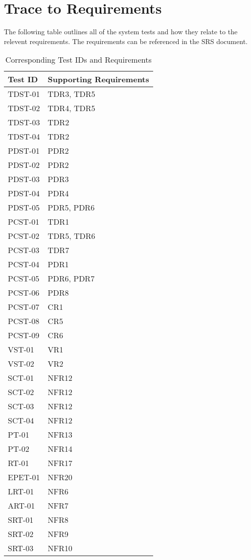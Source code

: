 \documentclass[12pt, titlepage]{article}
\begin{document}
\section{Trace to Requirements}

The following table outlines all of the system tests and how they relate to the
relevent requirements. The requirements can be referenced in the SRS document.\\

\begin{longtable}{ |p{4cm}|p{8cm}|  }
  \caption{Corresponding Test IDs and Requirements}
  \label{tab:Table1}\\
  
  \hline
  \textbf{Test ID} & \textbf{Supporting Requirements}\\
  \hline
  TDST-01 &  TDR3, TDR5\\
  \hline
  TDST-02 &  TDR4, TDR5 \\
  \hline
  TDST-03 &  TDR2 \\
  \hline
  TDST-04 &  TDR2 \\
  \hline
  PDST-01 &  PDR2 \\
  \hline
  PDST-02 &  PDR2 \\
  \hline
  PDST-03 &  PDR3 \\
  \hline
  PDST-04 &  PDR4 \\
  \hline
  PDST-05 &  PDR5, PDR6 \\
  \hline
  PCST-01 &  TDR1 \\
  \hline
  PCST-02 &  TDR5, TDR6 \\
  \hline
  PCST-03 &  TDR7 \\
  \hline
  PCST-04 &  PDR1 \\
  \hline
  PCST-05 &  PDR6, PDR7 \\
  \hline
  PCST-06 &  PDR8 \\
  \hline
  PCST-07 &  CR1 \\
  \hline
  PCST-08 &  CR5 \\
  \hline
  PCST-09 &  CR6 \\
  \hline
  VST-01 &  VR1 \\
  \hline
  VST-02&  VR2 \\
  \hline
  SCT-01 &  NFR12 \\
  \hline
  SCT-02 &  NFR12 \\
  \hline
  SCT-03 &  NFR12 \\
  \hline
  SCT-04 &  NFR12 \\
  \hline
  PT-01 & NFR13 \\
  \hline
  PT-02 & NFR14 \\
  \hline
  RT-01 & NFR17 \\
  \hline
  EPET-01 & NFR20 \\
  \hline
  LRT-01&  NFR6 \\
  \hline
  ART-01 & NFR7 \\
  \hline
  SRT-01 & NFR8 \\
  \hline
  SRT-02 & NFR9 \\
  \hline
  SRT-03 & NFR10 \\
  \hline
\end{longtable}
\end{document}
